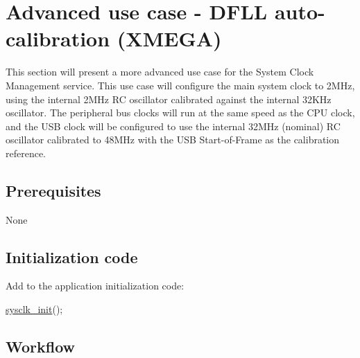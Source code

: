 \hypertarget{sysclk_quickstart_use_case_3_sysclk_quickstart_use_case_3}{}\section{Advanced use case -\/ D\-F\-L\-L auto-\/calibration (\-X\-M\-E\-G\-A)}\label{sysclk_quickstart_use_case_3_sysclk_quickstart_use_case_3}
This section will present a more advanced use case for the System Clock Management service. This use case will configure the main system clock to 2\-M\-Hz, using the internal 2\-M\-Hz R\-C oscillator calibrated against the internal 32\-K\-Hz oscillator. The peripheral bus clocks will run at the same speed as the C\-P\-U clock, and the U\-S\-B clock will be configured to use the internal 32\-M\-Hz (nominal) R\-C oscillator calibrated to 48\-M\-Hz with the U\-S\-B Start-\/of-\/\-Frame as the calibration reference.\hypertarget{sysclk_quickstart_use_case_3_sysclk_quickstart_use_case_3_prereq}{}\subsection{Prerequisites}\label{sysclk_quickstart_use_case_3_sysclk_quickstart_use_case_3_prereq}

\begin{DoxyItemize}
\item None
\end{DoxyItemize}\hypertarget{sysclk_quickstart_use_case_3_sysclk_quickstart_use_case_3_setup_steps}{}\subsection{Initialization code}\label{sysclk_quickstart_use_case_3_sysclk_quickstart_use_case_3_setup_steps}
Add to the application initialization code\-: 
\begin{DoxyCode}
        \hyperlink{group__sysclk__group_ga242399e48a97739c88b4d0c00f6101de}{sysclk\_init}();
\end{DoxyCode}
\hypertarget{sysclk_quickstart_use_case_3_sysclk_quickstart_use_case_3_setup_steps_workflow}{}\subsection{Workflow}\label{sysclk_quickstart_use_case_3_sysclk_quickstart_use_case_3_setup_steps_workflow}

